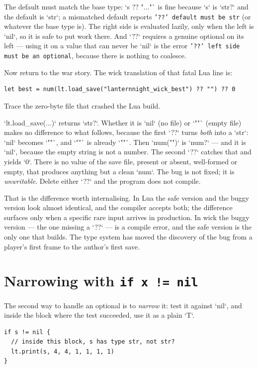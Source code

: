 \noindent
The default must match the base type: `s ?? "..."` is fine because `s` is
`str?` and the default is `str`; a mismatched default reports
\texttt{'??' default must be str} (or whatever the base type is). The right
side is evaluated lazily, only when the left is `nil`, so it is safe to put
work there. And `??` requires a genuine optional on its left --- using it on a
value that can never be `nil` is the error \texttt{'??' left side must be an
optional}, because there is nothing to coalesce.

Now return to the war story. The wick translation of that fatal Lua line is:

\begin{lstlisting}[language=wick]
let best = num(lt.load_save("lanternnight_wick_best") ?? "") ?? 0
\end{lstlisting}

\noindent
Trace the zero-byte file that crashed the Lua build.

`lt.load_save(...)` returns `str?`. Whether it is `nil` (no file) or `""`
(empty file) makes no difference to what follows, because the first `??`
turns \emph{both} into a `str`: `nil` becomes `""`, and `""` is already `""`.
Then `num("")` is `num?` --- and it is `nil`, because the empty string is not a
number. The second `??` catches that and yields `0`. There is no value of the
save file, present or absent, well-formed or empty, that produces anything but
a clean `num`. The bug is not fixed; it is \emph{unwritable}. Delete either
`??` and the program does not compile.

That is the difference worth internalising. In Lua the safe version and the
buggy version look almost identical, and the compiler accepts both; the
difference surfaces only when a specific rare input arrives in production. In
wick the buggy version --- the one missing a `??` --- is a compile error, and
the safe version is the only one that builds. The type system has moved the
discovery of the bug from a player's first frame to the author's first
save.

\section{Narrowing with \texttt{if x != nil}}

The second way to handle an optional is to \emph{narrow} it: test it against
`nil`, and inside the block where the test succeeded, use it as a plain `T`.

\begin{lstlisting}[language=wick]
if s != nil {
  // inside this block, s has type str, not str?
  lt.print(s, 4, 4, 1, 1, 1, 1)
}
\end{lstlisting}

